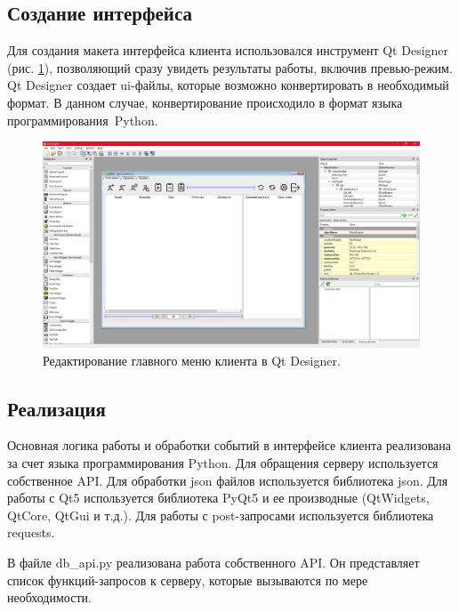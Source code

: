 \documentclass[14pt, a4paper]{extarticle}
\begin{document}
    \clearpage
    \subsection{Создание интерфейса}
    Для создания макета интерфейса клиента использовался инструмент Qt Designer (рис. \ref{fig:qtdesigner}), позволяющий сразу увидеть результаты работы, включив превью-режим. Qt Designer создает ui-файлы, которые возможно конвертировать в необходимый формат. В данном случае, конвертирование происходило в формат языка программирования Python.
    
    \begin{figure}[h]
        \centering
        \includegraphics[width=1\linewidth]{img/qtdesigner.png}
        \caption{Редактирование главного меню клиента в Qt Designer.}
        \label{fig:qtdesigner}
    \end{figure}


    \clearpage
    \subsection{Реализация}
    Основная логика работы и обработки событий в интерфейсе клиента реализована за счет языка программирования Python. Для обращения серверу используется собственное API. Для обработки json файлов используется библиотека json. Для работы с Qt5 используется библиотека PyQt5 и ее производные (QtWidgets, QtCore, QtGui и т.д.). Для работы с post-запросами используется библиотека requests.

    В файле db\_api.py реализована работа собственного API. Он представляет список функций-запросов к серверу, которые вызываются по мере необходимости.
    
    
\end{document}
